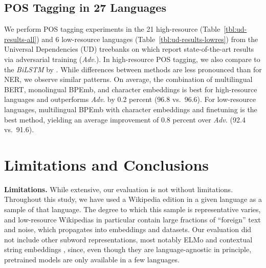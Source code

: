 \documentclass[11pt,a4paper]{article}
\begin{document}
\subsection{POS Tagging in 27 Languages}
We perform POS tagging experiments in the 21 high-resource (Table~\ref{tbl:ud-results-all}) and 6 low-resource languages (Table~\ref{tbl:ud-results-lowres}) from the Universal Dependencies (UD) treebanks on which \citet{yasunaga2018robust} report state-of-the-art results via adversarial training (\emph{Adv.}).
In high-resource POS tagging, we also compare to the \emph{BiLSTM} by \citet{plank2016multilingual}.
While differences between methods are less pronounced than for NER, we observe similar patterns.
On average, the combination of multilingual BERT, monolingual BPEmb, and character embeddings is best for high-resource languages and outperforms \emph{Adv.} by 0.2 percent (96.8 vs.\ 96.6).
For low-resource languages, multilingual BPEmb with character embeddings and finetuning is the best method, yielding an average improvement of 0.8 percent over \emph{Adv.} (92.4 vs.\ 91.6).

\section{Limitations and Conclusions}

\noindent\textbf{Limitations.} While extensive, our evaluation is not without limitations.
Throughout this study, we have used a Wikipedia edition in a given language as a sample of that language.
The degree to which this sample is representative varies, and low-resource Wikipedias in particular contain large fractions of ``foreign'' text and noise, which propagates into embeddings and datasets.
	Our evaluation did not include other subword representations, most notably ELMo \citep{peters2018contextualized} and contextual string embeddings \citep{akbik2018contextual}, since, even though they are language-agnostic in principle, pretrained models are only available in a few languages.
\end{document}

